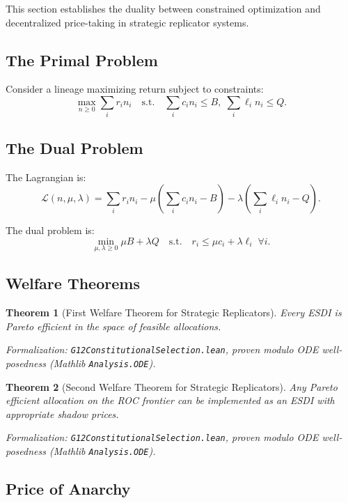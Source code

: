 \documentclass[12pt]{article}
\newtheorem{theorem}{Theorem}[section]
\begin{document}
This section establishes the duality between constrained optimization and decentralized price-taking in strategic replicator systems.

\subsection{The Primal Problem}

Consider a lineage maximizing return subject to constraints:
\[
\max_{n \geq 0} \sum_i r_i n_i \quad \text{s.t.} \quad \sum_i c_i n_i \leq B, \; \sum_i \ell_i n_i \leq Q.
\]

\subsection{The Dual Problem}

The Lagrangian is:
\[
\mathcal{L}(n, \mu, \lambda) = \sum_i r_i n_i - \mu \left( \sum_i c_i n_i - B \right) - \lambda \left( \sum_i \ell_i n_i - Q \right).
\]

The dual problem is:
\[
\min_{\mu, \lambda \geq 0} \mu B + \lambda Q \quad \text{s.t.} \quad r_i \leq \mu c_i + \lambda \ell_i \; \forall i.
\]

\subsection{Welfare Theorems}

\begin{theorem}[First Welfare Theorem for Strategic Replicators]
\label{thm:first-welfare}
Every ESDI is Pareto efficient in the space of feasible allocations.
\end{theorem}
\noindent\textit{Formalization: \texttt{G12ConstitutionalSelection.lean}, proven modulo ODE well-posedness (Mathlib \texttt{Analysis.ODE}).}

\begin{theorem}[Second Welfare Theorem for Strategic Replicators]
\label{thm:second-welfare}
Any Pareto efficient allocation on the ROC frontier can be implemented as an ESDI with appropriate shadow prices.
\end{theorem}
\noindent\textit{Formalization: \texttt{G12ConstitutionalSelection.lean}, proven modulo ODE well-posedness (Mathlib \texttt{Analysis.ODE}).}

\subsection{Price of Anarchy}
\end{document}
